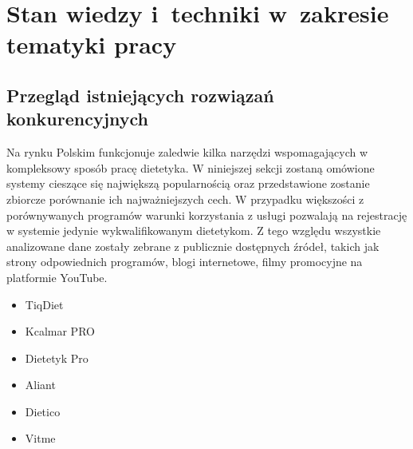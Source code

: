 \chapter{Stan wiedzy i~techniki w~zakresie tematyki pracy}\label{ch:knowladge-state}
\section{Przegląd istniejących rozwiązań konkurencyjnych}\label{sec:competitive-solutions}
Na rynku Polskim funkcjonuje zaledwie kilka narzędzi wspomagających w kompleksowy sposób pracę dietetyka.
W niniejszej sekcji zostaną omówione systemy cieszące się największą popularnością oraz przedstawione zostanie zbiorcze porównanie ich najważniejszych cech.
W przypadku większości z porównywanych programów warunki korzystania z usługi pozwalają na rejestrację w systemie jedynie wykwalifikowanym dietetykom.
Z tego względu wszystkie analizowane dane zostały zebrane z publicznie dostępnych źródeł, takich jak strony odpowiednich programów, blogi internetowe, filmy promocyjne na platformie YouTube\cite{url:youtube}.
\begin{itemize}
    \item TiqDiet\cite{url:tiqdiet}

    \item Kcalmar PRO\cite{url:kcalmar}

    \item Dietetyk Pro\cite{url:dietetyk-pro}

    \item Aliant\cite{url:aliant}

    \item Dietico\cite{url:dietico}

    \item Vitme\cite{url:vitme}

\end{itemize}

